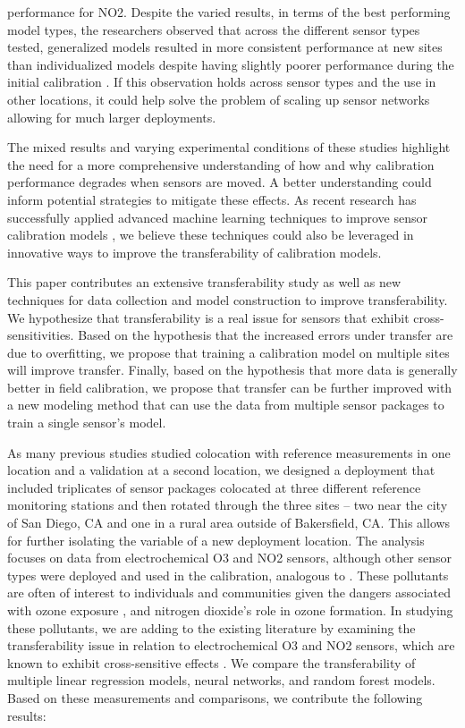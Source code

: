 \documentclass[journal abbreviation, manuscript]{copernicus}
\begin{document}
performance for NO2.  Despite the varied results, in terms of the best performing model types, the researchers observed that across the different sensor types tested, generalized models resulted in more consistent performance at new sites than individualized models despite having slightly poorer performance during the initial calibration \citep{Malings2018Development}.  If this observation holds across sensor types and the use in other locations, it could help solve the problem of scaling up sensor networks allowing for much larger deployments. 

The mixed results and varying experimental conditions of these studies highlight the need for a more comprehensive understanding of how and why calibration performance degrades when sensors are moved. A better understanding could inform potential strategies to mitigate these effects.  As recent research has successfully applied advanced machine learning techniques to improve sensor calibration models \citep{Zimmerman2018, DeVito2009, Casey2018Performance}, we believe these techniques could also be leveraged in innovative ways to improve the transferability of calibration models.

This paper contributes an extensive transferability study as well as new techniques for data collection and model construction to improve transferability.  We hypothesize that transferability is a real issue for sensors that exhibit cross-sensitivities.   Based on the hypothesis that the increased errors under transfer are due to overfitting, we propose that training a calibration model on multiple sites will improve transfer.  Finally, based on the hypothesis that more data is generally better in field calibration, we propose that transfer can be further improved with a new modeling method that can use the data from multiple sensor packages to train a single sensor's model.


As many previous studies studied colocation with reference measurements in one location and a validation at a second location, we designed a deployment that included triplicates of sensor packages colocated at three different reference monitoring stations and then rotated through the three sites – two  near the city of San Diego, CA and one in a rural area outside of Bakersfield, CA.   This allows for further isolating the variable of a new deployment location. The analysis focuses on data from electrochemical O3 and NO2 sensors, although other sensor types were deployed and used in the calibration, analogous to \citep{Bigi2018Performance}.  These pollutants are often of interest to individuals and communities given the dangers associated with ozone exposure \citep{Brunekreef2002Air}, and nitrogen dioxide’s role in ozone formation. In studying these pollutants, we are adding to the existing literature by examining the transferability issue in relation to electrochemical O3 and NO2 sensors, which are known to exhibit cross-sensitive effects \citep{SPINELLE2015480}.  We compare the transferability of multiple linear regression models, neural networks, and random forest models.  Based on these measurements and comparisons, we contribute the following results:
\end{document}
